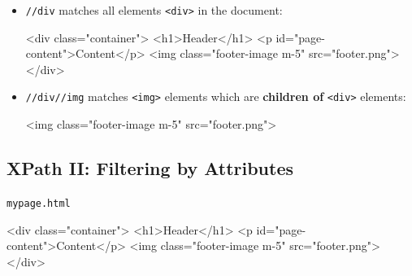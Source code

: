 \documentclass[
  letterpaper,
  DIV=11,
  numbers=noendperiod,
  oneside]{scrreprt}
\newenvironment{Shaded}{\begin{snugshade}}{\end{snugshade}}
\newcommand{\ErrorTok}[1]{\textcolor[rgb]{0.68,0.00,0.00}{#1}}
\newcommand{\KeywordTok}[1]{\textcolor[rgb]{0.00,0.23,0.31}{#1}}
\newcommand{\NormalTok}[1]{\textcolor[rgb]{0.00,0.23,0.31}{#1}}
\newcommand{\OtherTok}[1]{\textcolor[rgb]{0.00,0.23,0.31}{#1}}
\newcommand{\StringTok}[1]{\textcolor[rgb]{0.13,0.47,0.30}{#1}}
\begin{document}
\begin{itemize}
\item
  \texttt{\textquotesingle{}//div\textquotesingle{}} matches all
  elements \texttt{\textless{}div\textgreater{}} in the document:

\begin{Shaded}
\begin{Highlighting}[]
\KeywordTok{\textless{}div} \ErrorTok{class}\OtherTok{=}\StringTok{"container"}\KeywordTok{\textgreater{}}
  \KeywordTok{\textless{}h1\textgreater{}}\NormalTok{Header}\KeywordTok{\textless{}/h1\textgreater{}}
  \KeywordTok{\textless{}p} \ErrorTok{id}\OtherTok{=}\StringTok{"page{-}content"}\KeywordTok{\textgreater{}}\NormalTok{Content}\KeywordTok{\textless{}/p\textgreater{}}
  \KeywordTok{\textless{}img} \ErrorTok{class}\OtherTok{=}\StringTok{"footer{-}image m{-}5"} \ErrorTok{src}\OtherTok{=}\StringTok{"footer.png"}\KeywordTok{\textgreater{}}
\KeywordTok{\textless{}/div\textgreater{}}
\end{Highlighting}
\end{Shaded}
\item
  \texttt{\textquotesingle{}//div//img\textquotesingle{}} matches
  \texttt{\textless{}img\textgreater{}} elements which are
  \textbf{children of} \texttt{\textless{}div\textgreater{}} elements:

\begin{Shaded}
\begin{Highlighting}[]
\KeywordTok{\textless{}img} \ErrorTok{class}\OtherTok{=}\StringTok{"footer{-}image m{-}5"} \ErrorTok{src}\OtherTok{=}\StringTok{"footer.png"}\KeywordTok{\textgreater{}}
\end{Highlighting}
\end{Shaded}
\end{itemize}

\hypertarget{xpath-ii-filtering-by-attributes}{%
\subsection{XPath II: Filtering by
Attributes}\label{xpath-ii-filtering-by-attributes}}

\begin{codelisting}

\caption{\texttt{mypage.html}}

\begin{Shaded}
\begin{Highlighting}[]
\KeywordTok{\textless{}div} \ErrorTok{class}\OtherTok{=}\StringTok{"container"}\KeywordTok{\textgreater{}}
  \KeywordTok{\textless{}h1\textgreater{}}\NormalTok{Header}\KeywordTok{\textless{}/h1\textgreater{}}
  \KeywordTok{\textless{}p} \ErrorTok{id}\OtherTok{=}\StringTok{"page{-}content"}\KeywordTok{\textgreater{}}\NormalTok{Content}\KeywordTok{\textless{}/p\textgreater{}}
  \KeywordTok{\textless{}img} \ErrorTok{class}\OtherTok{=}\StringTok{"footer{-}image m{-}5"} \ErrorTok{src}\OtherTok{=}\StringTok{"footer.png"}\KeywordTok{\textgreater{}}
\KeywordTok{\textless{}/div\textgreater{}}
\end{Highlighting}
\end{Shaded}

\end{codelisting}
\end{document}
